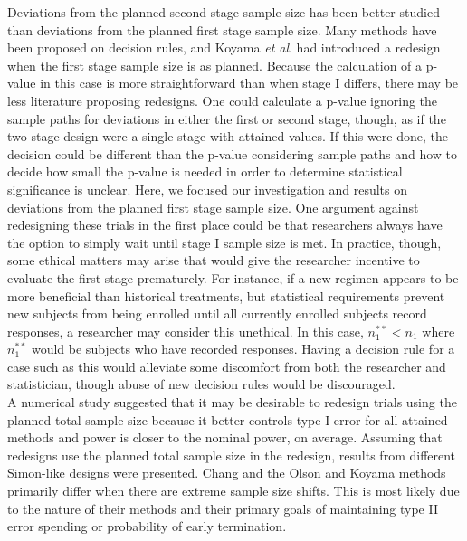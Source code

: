 \documentclass[12pt]{report}\usepackage[]{graphicx}\usepackage[]{color}
\newlength{\li}\setlength{\li}{14.48pt}
\newlength{\di}\setlength{\di}{-3.5mm}
\begin{document}
Deviations from the planned second stage sample size has been better studied than deviations from the planned first stage sample size. Many methods have been proposed on decision rules, and Koyama \textit{et al}. had introduced a redesign when the first stage sample size is as planned. Because the calculation of a p-value in this case is more straightforward than when stage I differs, there may be less literature proposing redesigns. One could calculate a p-value ignoring the sample paths for deviations in either the first or second stage, though, as if the two-stage design were a single stage with attained values. If this were done, the decision could be different than the p-value considering sample paths and how to decide how small the p-value is needed in order to determine statistical significance is unclear. Here, we focused our investigation and results on deviations from the planned first stage sample size. One argument against redesigning these trials in the first place could be that researchers always have the option to simply wait until stage I sample size is met. In practice, though, some ethical matters may arise that would give the researcher incentive to evaluate the first stage prematurely. For instance, if a new regimen appears to be more beneficial than historical treatments, but statistical requirements prevent new subjects from being enrolled until all currently enrolled subjects record responses, a researcher may consider this unethical. In this case, $n_1^{\ast\ast} < n_1$ where $n_1^{\ast\ast}$ would be subjects who have recorded responses. Having a decision rule for a case such as this would alleviate some discomfort from both the researcher and statistician, though abuse of new decision rules would be discouraged. \\
\indent A numerical study suggested that it may be desirable to redesign trials using the planned total sample size because it better controls type I error for all attained methods and power is closer to the nominal power, on average. Assuming that redesigns use the planned total sample size in the redesign, results from different Simon-like designs were presented.  Chang and the Olson and Koyama methods primarily differ when there are extreme sample size shifts. This is most likely due to the nature of their methods and their primary goals of maintaining type II error spending or probability of early termination. \\
\end{document}

